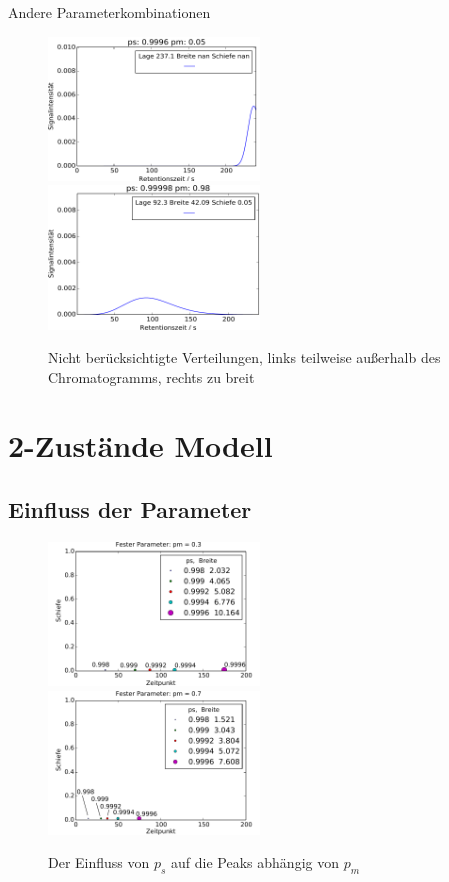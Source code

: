 Andere Parameterkombinationen 

\begin{figure}[h]
\includegraphics[width=0.5\textwidth]{bilder/outof240}
\includegraphics[width=0.5\textwidth]{bilder/huegel}

\caption[Nicht berücksichtigte Verteilungen]{Nicht berücksichtigte Verteilungen, links teilweise außerhalb des Chromatogramms, rechts zu breit}
\label{kein_peak}
\end{figure}


\section{2-Zustände Modell} 



\subsection{Einfluss der Parameter}

\begin{figure}[h]
\includegraphics[width=0.5\textwidth]{bilder/ps/psfest_pm03}
\includegraphics[width=0.5\textwidth]{bilder/ps/psfest_pm07}

\caption{Der Einfluss von $p_{s}$ auf die Peaks abhängig von $p_{m}$}
\label{einfluss_ps_1}
\end{figure}


